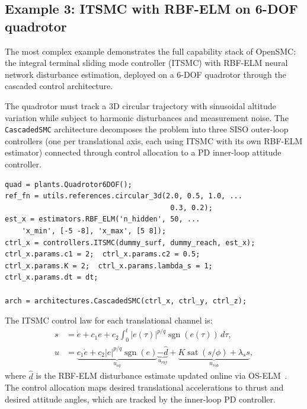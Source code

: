 \documentclass[preprint,12pt]{elsarticle}
\begin{document}
\subsection{Example 3: ITSMC with RBF-ELM on 6-DOF quadrotor}
\label{sec:ex3}

The most complex example demonstrates the full capability stack of OpenSMC: the integral terminal sliding mode controller (ITSMC) with RBF-ELM neural network disturbance estimation, deployed on a 6-DOF quadrotor through the cascaded control architecture.

The quadrotor must track a 3D circular trajectory with sinusoidal altitude variation while subject to harmonic disturbances and measurement noise. The \texttt{CascadedSMC} architecture decomposes the problem into three SISO outer-loop controllers (one per translational axis, each using ITSMC with its own RBF-ELM estimator) connected through control allocation to a PD inner-loop attitude controller.

\begin{lstlisting}[style=matlab,caption={ITSMC--RBF-ELM quadrotor setup (excerpt from \texttt{example\_itsmc\_quadrotor.m}).},label=lst:quad]
quad = plants.Quadrotor6DOF();
ref_fn = utils.references.circular_3d(2.0, 0.5, 1.0, ...
                                       0.3, 0.2);
est_x = estimators.RBF_ELM('n_hidden', 50, ...
    'x_min', [-5 -8], 'x_max', [5 8]);
ctrl_x = controllers.ITSMC(dummy_surf, dummy_reach, est_x);
ctrl_x.params.c1 = 2;  ctrl_x.params.c2 = 0.5;
ctrl_x.params.K = 2;  ctrl_x.params.lambda_s = 1;
ctrl_x.params.dt = dt;

arch = architectures.CascadedSMC(ctrl_x, ctrl_y, ctrl_z);
\end{lstlisting}

The ITSMC control law for each translational channel is:
\begin{align}
    s &= \dot{e} + c_1 e + c_2 \int_0^t |e(\tau)|^{p/q} \operatorname{sgn}(e(\tau))\, d\tau, \label{eq:itsmc_surface} \\
    u &= \underbrace{c_1 \dot{e} + c_2 |e|^{p/q}\operatorname{sgn}(e)}_{u_{eq}} \underbrace{- \hat{d}}_{u_{rbf}} + \underbrace{K\operatorname{sat}(s/\phi) + \lambda_s s}_{u_{rob}}, \label{eq:itsmc_law}
\end{align}
where $\hat{d}$ is the RBF-ELM disturbance estimate updated online via OS-ELM~\cite{huang2006extreme}. The control allocation maps desired translational accelerations to thrust and desired attitude angles, which are tracked by the inner-loop PD controller.
\end{document}
